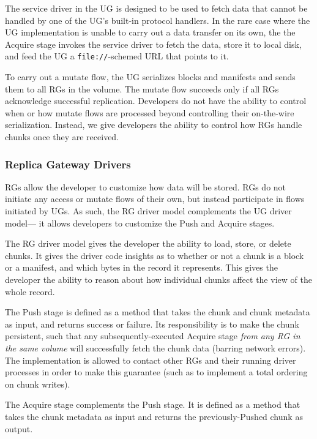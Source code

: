   The service driver in the UG is designed to
be used to fetch data that cannot be handled by one of the UG's built-in
protocol handlers.  In the rare case where the UG implementation is unable to carry out
a data transfer on its own, the the Acquire stage 
invokes the service driver to fetch the data, store it to local disk, and feed the UG a
\texttt{file://}-schemed URL that points to it.

To carry out a mutate flow, the UG serializes blocks and manifests and sends them to all RGs
in the volume.  The mutate flow succeeds only if all RGs
acknowledge successful replication.  Developers do not have the ability to
control when or how mutate flows are processed beyond controlling their
on-the-wire serialization.  Instead, we give developers the
ability to control how RGs handle chunks once they are received.

\subsubsection{Replica Gateway Drivers}

RGs allow the developer to customize how data will be stored.  RGs do not
initiate any access or mutate flows of their own, but instead participate in
flows initiated by UGs.  As such, the RG driver model complements the UG driver model---
it allows developers to customize the Push and Acquire stages.

  The RG driver model gives the developer
the ability to load, store, or delete chunks.  It gives the driver code insights
as to whether or not a chunk is a block or a manifest, and which bytes in the
record it represents.  This gives the developer the ability to reason about how
individual chunks affect the view of the whole record.

The Push stage is defined as a method that takes the chunk and chunk metadata as
input, and returns success or failure.  Its responsibility is to make the chunk
persistent, such that any subsequently-executed Acquire stage \emph{from any
RG in the same volume} will successfully fetch the chunk data (barring network
errors).  The implementation is allowed to contact other RGs and their running
driver processes in order to make this guarantee (such as to implement a total
ordering on chunk writes).

The Acquire stage complements the Push stage.  It is defined as a method that
takes the chunk metadata as input and returns the previously-Pushed chunk as
output.

